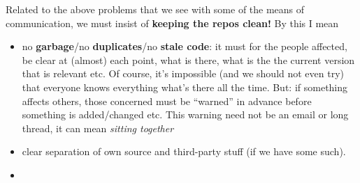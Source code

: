 \begin{itemize}
    Related to the above problems that we see with some of the means of
    communication, we must insist of \textbf{keeping the repos clean!} 
    By this I mean
    \begin{itemize}
    \item no \textbf{garbage}/no \textbf{duplicates}/no \textbf{stale
        code}: it must for the people affected, be clear at (almost) each
      point, what is there, what is the the current version that is
      relevant etc.  Of course, it's impossible (and we should not even
      try) that everyone knows everything what's there all the time.  But:
      if something affects others, those concerned must be ``warned'' in
      advance before something is added/changed etc. This warning need not
      be an email or long thread, it can mean \emph{sitting together}
    \item clear separation of own source and third-party stuff (if we have
      some such).
    \item
    \end{itemize}
\end{itemize}



%


%

